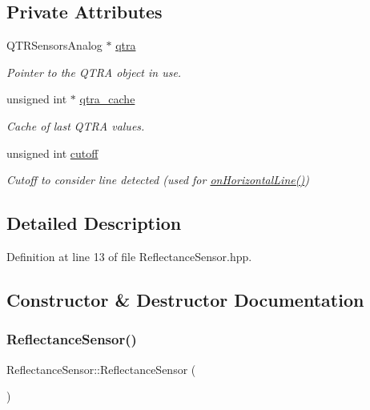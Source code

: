 \subsection*{Private Attributes}
\begin{DoxyCompactItemize}
\item 
Q\+T\+R\+Sensors\+Analog $\ast$ \hyperlink{class_reflectance_sensor_a1eb0a090b619705b0234cea224400829}{qtra}
\begin{DoxyCompactList}\small\item\em Pointer to the Q\+T\+RA object in use. \end{DoxyCompactList}\item 
unsigned int $\ast$ \hyperlink{class_reflectance_sensor_ab4b708129419215a57eec3b0af611542}{qtra\+\_\+cache}
\begin{DoxyCompactList}\small\item\em Cache of last Q\+T\+RA values. \end{DoxyCompactList}\item 
unsigned int \hyperlink{class_reflectance_sensor_ab690b7c2e5b1ba69c0068841fe916dbd}{cutoff}
\begin{DoxyCompactList}\small\item\em Cutoff to consider line detected (used for \hyperlink{class_reflectance_sensor_a30b767c95bec679ff638765050c770e2}{on\+Horizontal\+Line()}) \end{DoxyCompactList}\end{DoxyCompactItemize}


\subsection{Detailed Description}


Definition at line 13 of file Reflectance\+Sensor.\+hpp.



\subsection{Constructor \& Destructor Documentation}
\mbox{\label{class_reflectance_sensor_a0460515b96ac26e3fcf0cfb74a6dd324}} 
\subsubsection{\texorpdfstring{Reflectance\+Sensor()}{ReflectanceSensor()}}
{\footnotesize\ttfamily Reflectance\+Sensor\+::\+Reflectance\+Sensor (\begin{DoxyParamCaption}{ }\end{DoxyParamCaption})}



